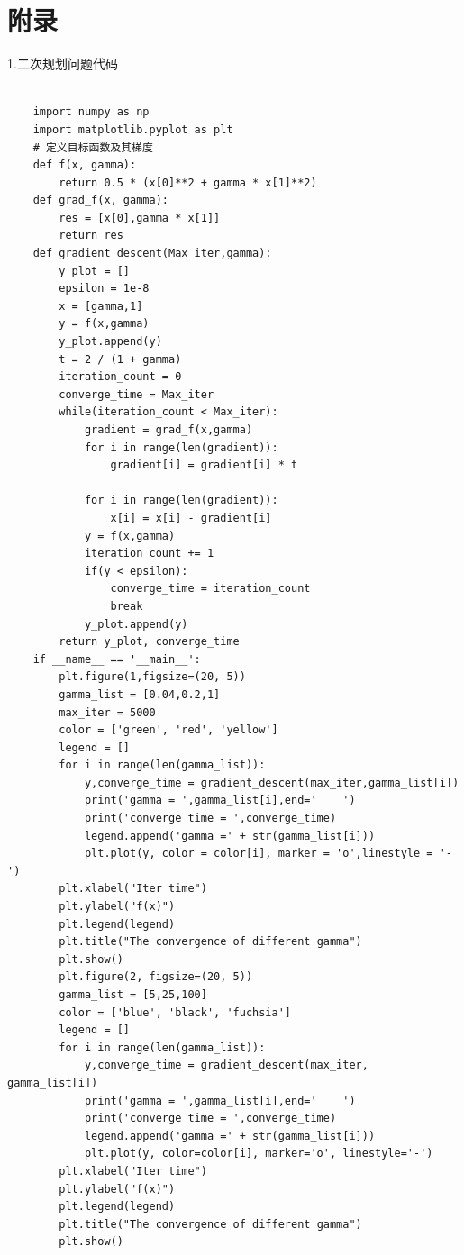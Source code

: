 \documentclass{article}
\begin{document}
{\section*{附录}}
1.二次规划问题代码
\begin{lstlisting}

    import numpy as np
    import matplotlib.pyplot as plt
    # 定义目标函数及其梯度
    def f(x, gamma):
        return 0.5 * (x[0]**2 + gamma * x[1]**2)
    def grad_f(x, gamma):
        res = [x[0],gamma * x[1]]
        return res
    def gradient_descent(Max_iter,gamma):
        y_plot = []
        epsilon = 1e-8
        x = [gamma,1]
        y = f(x,gamma)
        y_plot.append(y)
        t = 2 / (1 + gamma)
        iteration_count = 0
        converge_time = Max_iter
        while(iteration_count < Max_iter):
            gradient = grad_f(x,gamma)
            for i in range(len(gradient)):
                gradient[i] = gradient[i] * t

            for i in range(len(gradient)):
                x[i] = x[i] - gradient[i]
            y = f(x,gamma)
            iteration_count += 1
            if(y < epsilon):
                converge_time = iteration_count
                break
            y_plot.append(y)
        return y_plot, converge_time
    if __name__ == '__main__':
        plt.figure(1,figsize=(20, 5))
        gamma_list = [0.04,0.2,1]
        max_iter = 5000
        color = ['green', 'red', 'yellow']
        legend = []
        for i in range(len(gamma_list)):
            y,converge_time = gradient_descent(max_iter,gamma_list[i])
            print('gamma = ',gamma_list[i],end='    ')
            print('converge time = ',converge_time)
            legend.append('gamma =' + str(gamma_list[i]))
            plt.plot(y, color = color[i], marker = 'o',linestyle = '-')
        plt.xlabel("Iter time")
        plt.ylabel("f(x)")
        plt.legend(legend)
        plt.title("The convergence of different gamma")
        plt.show()
        plt.figure(2, figsize=(20, 5))
        gamma_list = [5,25,100]
        color = ['blue', 'black', 'fuchsia']
        legend = []
        for i in range(len(gamma_list)):
            y,converge_time = gradient_descent(max_iter, gamma_list[i])
            print('gamma = ',gamma_list[i],end='    ')
            print('converge time = ',converge_time)
            legend.append('gamma =' + str(gamma_list[i]))
            plt.plot(y, color=color[i], marker='o', linestyle='-')
        plt.xlabel("Iter time")
        plt.ylabel("f(x)")
        plt.legend(legend)
        plt.title("The convergence of different gamma")
        plt.show()

    \end{lstlisting}
\end{document}

